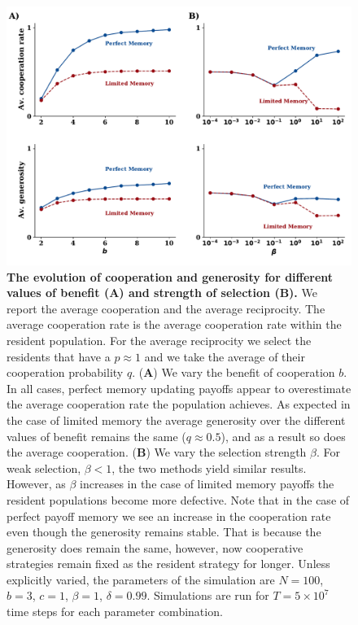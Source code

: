 \documentclass[11pt]{article}
\theoremstyle{plainCl1}
\theoremstyle{plainCl2}
\begin{document}
{\begin{figure}[!htbp]
    \centering
    \includegraphics[width=.75\textwidth]{static/cooperation_rate_over_b_and_beta.pdf}
    \caption{{\bf The evolution of cooperation and generosity for different
    values of benefit (A) and strength of selection (B).} We report the average
    cooperation and the average reciprocity. The average cooperation rate is the
    average cooperation rate within the resident population. For the average
    reciprocity we select the residents that have a $p \approx 1$ and we take
    the average of their cooperation probability $q$. ({\bf A}) We vary the
    benefit of cooperation $b$. In all cases, perfect memory updating payoffs
    appear to overestimate the average cooperation rate the population achieves.
    As expected in the case of limited memory the average generosity over the
    different values of benefit remains the same ($q \approx 0.5$), and as a
    result so does the average cooperation. ({\bf B}) We vary the selection
    strength $\beta$. For weak selection, \(\beta < 1\), the two methods yield
    similar results. However, as \(\beta\) increases in the case of limited
    memory payoffs the resident populations become more defective. Note that
    in the case of perfect payoff memory we see an increase in the cooperation
    rate even though the generosity remains stable. That is because the
    generosity does remain the same, however, now cooperative strategies remain
    fixed as the resident strategy for longer.
    Unless
    explicitly varied, the parameters of the simulation are $N\!=\!100$,
    $b\!=\!3$, $c\!=\!1$, $\beta\!=\!1$, $\delta\!=\!0.99$. Simulations are run
    for $T\!=\!5\times 10^7$ time steps for each parameter
    combination.}\label{fig:cooperation_rate_over_benefit_and_beta}
\end{figure}


}
\end{document}
